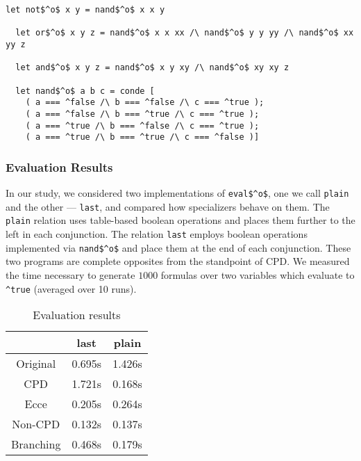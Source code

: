 \begin{figure*}[!h]
  \centering
  \begin{minipage}{0.7\textwidth}
    \begin{lstlisting}[label={not:nando}, caption={Implementation of boolean operation via \lstinline{nand}}, captionpos=b, frame=tb]
  let not$^o$ x y = nand$^o$ x x y

  let or$^o$ x y z = nand$^o$ x x xx /\ nand$^o$ y y yy /\ nand$^o$ xx yy z

  let and$^o$ x y z = nand$^o$ x y xy /\ nand$^o$ xy xy z

  let nand$^o$ a b c = conde [
    ( a === ^false /\ b === ^false /\ c === ^true );
    ( a === ^false /\ b === ^true /\ c === ^true );
    ( a === ^true /\ b === ^false /\ c === ^true );
    ( a === ^true /\ b === ^true /\ c === ^false )]
    \end{lstlisting}
  \end{minipage}
\end{figure*}

\subsubsection{Evaluation Results}
In our study, we considered two implementations of \lstinline{eval$^o$}, one we call \lstinline{plain} and the other --- \lstinline{last}, and compared how specializers behave on them.
The \lstinline{plain} relation uses table-based boolean operations and places them further to the left in each conjunction.
The relation \lstinline{last} employs boolean operations implemented via \lstinline{nand$^o$} and place them at the end of each conjunction.
These two programs are complete opposites from the standpoint of CPD.
We measured the time necessary to generate $1000$ formulas over two variables which evaluate to \lstinline{^true} (averaged over 10 runs).


\begin{table}
  \centering
  \begin{tabular}{c||c||c}
                   & last    & plain  \\
  \hline\hline
  Original         & 0.695s  & 1.426s \\
  \hline
  CPD              & 1.721s  & 0.168s \\
  \hline
  Ecce             & 0.205s  & 0.264s \\
  \hline
  Non-CPD          & 0.132s  & 0.137s \\
  \hline
  Branching        & 0.468s  & 0.179s \\
  \end{tabular}

  \caption{Evaluation results}
  \label{tbl:eval}
\end{table}


